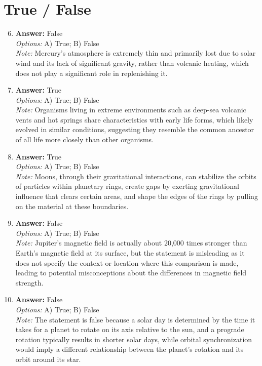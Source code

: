 \documentclass[12pt]{article}
\begin{document}
\section*{True / False}
\begin{enumerate}[label=\arabic*.]
\setcounter{enumi}{5}
\item \textbf{Answer:} False
\\ \textit{Options:} A) True; B) False
\\ \textit{Note:} Mercury's atmosphere is extremely thin and primarily lost due to solar wind and its lack of significant gravity, rather than volcanic heating, which does not play a significant role in replenishing it.
\item \textbf{Answer:} True
\\ \textit{Options:} A) True; B) False
\\ \textit{Note:} Organisms living in extreme environments such as deep-sea volcanic vents and hot springs share characteristics with early life forms, which likely evolved in similar conditions, suggesting they resemble the common ancestor of all life more closely than other organisms.
\item \textbf{Answer:} True
\\ \textit{Options:} A) True; B) False
\\ \textit{Note:} Moons, through their gravitational interactions, can stabilize the orbits of particles within planetary rings, create gaps by exerting gravitational influence that clears certain areas, and shape the edges of the rings by pulling on the material at these boundaries.
\item \textbf{Answer:} False
\\ \textit{Options:} A) True; B) False
\\ \textit{Note:} Jupiter's magnetic field is actually about 20,000 times stronger than Earth's magnetic field at its surface, but the statement is misleading as it does not specify the context or location where this comparison is made, leading to potential misconceptions about the differences in magnetic field strength.
\item \textbf{Answer:} False
\\ \textit{Options:} A) True; B) False
\\ \textit{Note:} The statement is false because a solar day is determined by the time it takes for a planet to rotate on its axis relative to the sun, and a prograde rotation typically results in shorter solar days, while orbital synchronization would imply a different relationship between the planet's rotation and its orbit around its star.
\end{enumerate}
\end{document}
